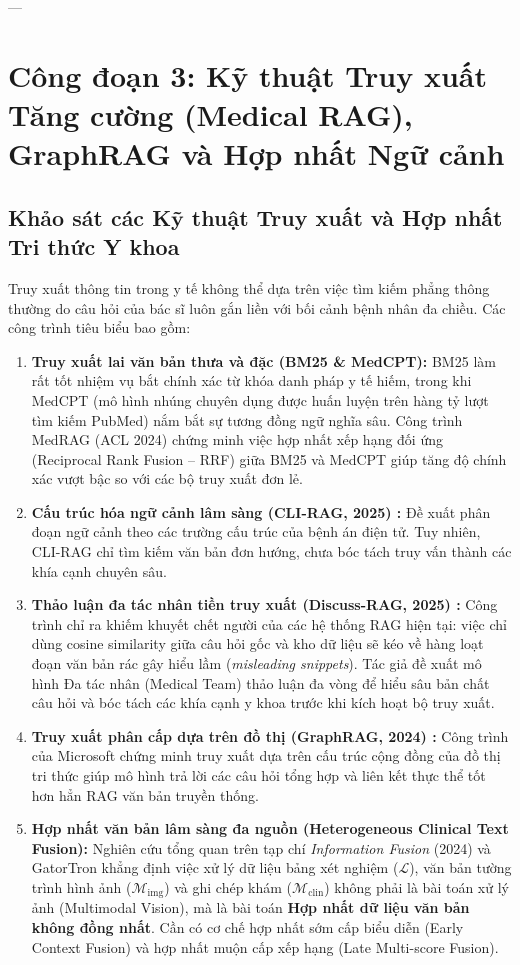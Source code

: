 ---

\section{Công đoạn 3: Kỹ thuật Truy xuất Tăng cường (Medical RAG), GraphRAG và Hợp nhất Ngữ cảnh}

\subsection{Khảo sát các Kỹ thuật Truy xuất và Hợp nhất Tri thức Y khoa}
Truy xuất thông tin trong y tế không thể dựa trên việc tìm kiếm phẳng thông thường do câu hỏi của bác sĩ luôn gắn liền với bối cảnh bệnh nhân đa chiều. Các công trình tiêu biểu bao gồm:
\begin{enumerate}
    \item \textbf{Truy xuất lai văn bản thưa và đặc (BM25 \& MedCPT):} BM25 \cite{robertson2009} làm rất tốt nhiệm vụ bắt chính xác từ khóa danh pháp y tế hiếm, trong khi MedCPT \cite{jin2023medcpt} (mô hình nhúng chuyên dụng được huấn luyện trên hàng tỷ lượt tìm kiếm PubMed) nắm bắt sự tương đồng ngữ nghĩa sâu. Công trình MedRAG (ACL 2024) \cite{xiong2024medrag} chứng minh việc hợp nhất xếp hạng đối ứng (Reciprocal Rank Fusion -- RRF) giữa BM25 và MedCPT giúp tăng độ chính xác vượt bậc so với các bộ truy xuất đơn lẻ.
    \item \textbf{Cấu trúc hóa ngữ cảnh lâm sàng (CLI-RAG, 2025) \cite{clirag2024}:} Đề xuất phân đoạn ngữ cảnh theo các trường cấu trúc của bệnh án điện tử. Tuy nhiên, CLI-RAG chỉ tìm kiếm văn bản đơn hướng, chưa bóc tách truy vấn thành các khía cạnh chuyên sâu.
    \item \textbf{Thảo luận đa tác nhân tiền truy xuất (Discuss-RAG, 2025) \cite{dong2025discuss}:} Công trình chỉ ra khiếm khuyết chết người của các hệ thống RAG hiện tại: việc chỉ dùng cosine similarity giữa câu hỏi gốc và kho dữ liệu sẽ kéo về hàng loạt đoạn văn bản rác gây hiểu lầm (\emph{misleading snippets}). Tác giả đề xuất mô hình Đa tác nhân (Medical Team) thảo luận đa vòng để hiểu sâu bản chất câu hỏi và bóc tách các khía cạnh y khoa trước khi kích hoạt bộ truy xuất.
    \item \textbf{Truy xuất phân cấp dựa trên đồ thị (GraphRAG, 2024) \cite{edge2024graphrag}:} Công trình của Microsoft chứng minh truy xuất dựa trên cấu trúc cộng đồng của đồ thị tri thức giúp mô hình trả lời các câu hỏi tổng hợp và liên kết thực thể tốt hơn hẳn RAG văn bản truyền thống.
    \item \textbf{Hợp nhất văn bản lâm sàng đa nguồn (Heterogeneous Clinical Text Fusion):} Nghiên cứu tổng quan trên tạp chí \emph{Information Fusion} (2024) \cite{fusion_review_2024} và GatorTron \cite{yang2022gatortron} khẳng định việc xử lý dữ liệu bảng xét nghiệm ($\mathcal{L}$), văn bản tường trình hình ảnh ($\mathcal{M}_{\mathrm{img}}$) và ghi chép khám ($\mathcal{M}_{\mathrm{clin}}$) không phải là bài toán xử lý ảnh (Multimodal Vision), mà là bài toán \textbf{Hợp nhất dữ liệu văn bản không đồng nhất}. Cần có cơ chế hợp nhất sớm cấp biểu diễn (Early Context Fusion) và hợp nhất muộn cấp xếp hạng (Late Multi-score Fusion).
\end{enumerate}

